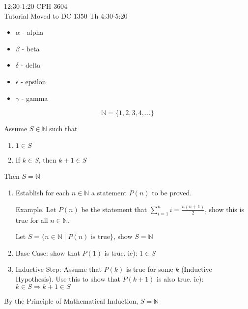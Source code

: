 
12:30-1:20 CPH 3604\\
Tutorial Moved to DC 1350 Th 4:30-5:20

\begin{itemize}
    \item $\alpha$ - alpha
    \item $\beta$ - beta
    \item $\delta$ - delta
    \item $\epsilon$ - epsilon
    \item $\gamma$ - gamma
\end{itemize}

$$\mathbb{N} = \{1,2,3,4,\dots\}$$



\newtheorem{mathinduct}{Axiom}

\begin{axiom}
Assume $S\in \mathbb{N}$ such that 
\begin{enumerate}
\item $1\in S$
\item If $k\in S$, then $k+1 \in S$
\end{enumerate}
Then $S=\mathbb{N}$
\end{axiom}

\begin{enumerate}
\item Establish for each $n\in \mathbb{N}$ a statement $P(n)$ to be proved.

Example. Let $P(n)$ be the statement that $\sum_{i=1}^n i = \frac{n(n+1)}{2}$, show this is true for all $n\in \mathbb{N}$.


    Let $S = \{n\in \mathbb{N}  \mid P(n) \text{ is true}\}$, show $S=\mathbb{N}$

\item Base Case: show that $P(1)$ is true. ie): $1\in S$
\item Inductive Step: Assume that $P(k)$ is true for some $k$ (Inductive Hypothesis). Use this to show that $P(k+1)$ is also true. ie): $k\in S \Rightarrow k+1\in S$

\end{enumerate}
By the Principle of Mathematical Induction, $S=\mathbb{N}$

